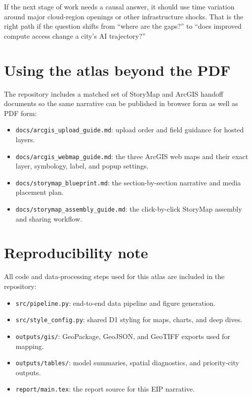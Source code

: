 \documentclass[11pt]{article}
\begin{document}
If the next stage of work needs a causal answer, it should use time variation around major cloud-region openings or other infrastructure shocks. That is the right path if the question shifts from ``where are the gaps?'' to ``does improved compute access change a city's AI trajectory?''

\section{Using the atlas beyond the PDF}
The repository includes a matched set of StoryMap and ArcGIS handoff documents so the same narrative can be published in browser form as well as PDF form:
\begin{itemize}[leftmargin=*]
  \item \texttt{docs/arcgis\_upload\_guide.md}: upload order and field guidance for hosted layers.
  \item \texttt{docs/arcgis\_webmap\_guide.md}: the three ArcGIS web maps and their exact layer, symbology, label, and popup settings.
  \item \texttt{docs/storymap\_blueprint.md}: the section-by-section narrative and media placement plan.
  \item \texttt{docs/storymap\_assembly\_guide.md}: the click-by-click StoryMap assembly and sharing workflow.
\end{itemize}

\section{Reproducibility note}
All code and data-processing steps used for this atlas are included in the repository:
\begin{itemize}[leftmargin=*]
  \item \texttt{src/pipeline.py}: end-to-end data pipeline and figure generation.
  \item \texttt{src/style\_config.py}: shared D1 styling for maps, charts, and deep dives.
  \item \texttt{outputs/gis/}: GeoPackage, GeoJSON, and GeoTIFF exports used for mapping.
  \item \texttt{outputs/tables/}: model summaries, spatial diagnostics, and priority-city outputs.
  \item \texttt{report/main.tex}: the report source for this EIP narrative.
\end{itemize}

\newpage
\end{document}
